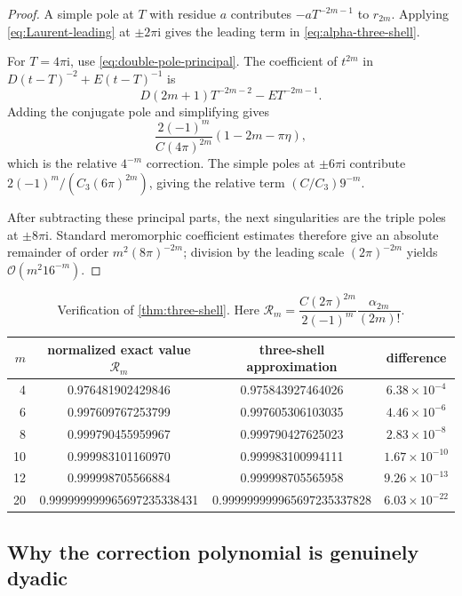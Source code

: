 \documentclass[11pt,oneside]{article}
\theoremstyle{frontier}
\theoremstyle{definition}
\theoremstyle{remark}
\newcommand{\ii}{\mathrm i}
\newcommand{\BigO}{\mathcal O}
\begin{document}
\begin{proof}
A simple pole at $T$ with residue $a$ contributes $-aT^{-2m-1}$ to $r_{2m}$.  Applying
\eqref{eq:Laurent-leading} at $\pm2\pi\ii$ gives the leading term in
\eqref{eq:alpha-three-shell}.

For $T=4\pi\ii$, use \eqref{eq:double-pole-principal}.  The coefficient of $t^{2m}$ in
$D(t-T)^{-2}+E(t-T)^{-1}$ is
\[
 D(2m+1)T^{-2m-2}-ET^{-2m-1}.
\]
Adding the conjugate pole and simplifying gives
\[
 \frac{2(-1)^m}{C(4\pi)^{2m}}(1-2m-\pi\eta),
\]
which is the relative $4^{-m}$ correction.  The simple poles at $\pm6\pi\ii$ contribute
$2(-1)^m/(C_3(6\pi)^{2m})$, giving the relative term $(C/C_3)9^{-m}$.

After subtracting these principal parts, the next singularities are the triple poles at
$\pm8\pi\ii$.  Standard meromorphic coefficient estimates therefore give an absolute remainder
of order $m^2(8\pi)^{-2m}$; division by the leading scale $(2\pi)^{-2m}$ yields
$\BigO(m^2 16^{-m})$.
\end{proof}

\begin{table}[htbp]
\centering
\small
\begin{tabular}{@{}rccc@{}}
\toprule
$m$ & normalized exact value $\mathcal R_m$ & three-shell approximation & difference \\
\midrule
4  & 0.976481902429846 & 0.975843927464026 & $6.38\times10^{-4}$ \\
6  & 0.997609767253799 & 0.997605306103035 & $4.46\times10^{-6}$ \\
8  & 0.999790455959967 & 0.999790427625023 & $2.83\times10^{-8}$ \\
10 & 0.999983101160970 & 0.999983100994111 & $1.67\times10^{-10}$ \\
12 & 0.999998705566884 & 0.999998705565958 & $9.26\times10^{-13}$ \\
20 & 0.999999999965697235338431 & 0.999999999965697235337828 & $6.03\times10^{-22}$ \\
\bottomrule
\end{tabular}
\caption{Verification of \cref{thm:three-shell}.  Here
$\mathcal R_m=\dfrac{C(2\pi)^{2m}}{2(-1)^m}\dfrac{\alpha_{2m}}{(2m)!}$.}
\label{tab:three-shell}
\end{table}

\subsection{Why the correction polynomial is genuinely dyadic}
\end{document}
